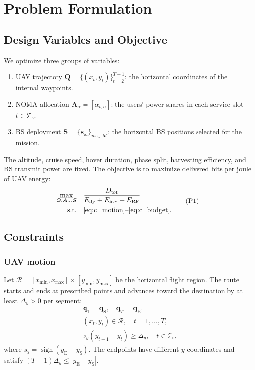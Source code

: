 \documentclass[conference]{IEEEtran}
\newcommand{\RF}{\mathrm{RF}}
\newcommand{\fly}{\mathrm{fly}}
\newcommand{\hov}{\mathrm{hov}}
\newcommand{\tot}{\mathrm{tot}}
\newcommand{\setT}{\mathcal{T}_{\mathrm{s}}}
\newcommand{\setM}{\mathcal{M}}
\begin{document}
\section{Problem Formulation}
\label{subsec:problem_formulation}
\subsection{Design Variables and Objective}
We optimize three groups of variables:
\begin{enumerate}
\item UAV trajectory $\bm Q=\{(x_t,y_t)\}_{t=2}^{T-1}$: the horizontal coordinates of the internal waypoints.
\item NOMA allocation $\bm A_{\alpha}=[\alpha_{t,n}]$: the users' power shares in each service slot $t\in\setT$.
\item BS deployment $\bm S=\{\bm s_m\}_{m\in\setM}$: the horizontal BS positions selected for the mission.
\end{enumerate}
The altitude, cruise speed, hover duration, phase split, harvesting efficiency, and BS transmit power are fixed. The objective is to maximize delivered bits per joule of UAV energy:
\begin{equation}
\begin{aligned}
\max_{\bm Q,\bm A_{\alpha},\bm S}\quad
&\frac{D_{\tot}}{E_{\fly}+E_{\hov}+E_{\RF}}\\
\mathrm{s.t.}\quad&\eqref{eq:c_motion}\text{--}\eqref{eq:c_budget}.
\end{aligned}
\tag{P1}\label{eq:P1}
\end{equation}
\subsection{Constraints}
\subsubsection{UAV motion}
Let $\mathcal R=[x_{\min},x_{\max}]\times[y_{\min},y_{\max}]$ be the horizontal flight region. The route starts and ends at prescribed points and advances toward the destination by at least $\Delta_y>0$ per segment:
\begin{equation}
\begin{aligned}
&\bm q_1=\bm q_{\mathrm S},\quad \bm q_T=\bm q_{\mathrm E},\\
&(x_t,y_t)\in\mathcal R,\quad t=1,\ldots,T,\\
&s_y(y_{t+1}-y_t)\ge\Delta_y,\quad t\in\setT,
\end{aligned}
\tag{C1}\label{eq:c_motion}
\end{equation}
where $s_y=\operatorname{sign}(y_{\mathrm E}-y_{\mathrm S})$. The endpoints have different $y$-coordinates and satisfy $(T-1)\Delta_y\le|y_{\mathrm E}-y_{\mathrm S}|$.
\end{document}
